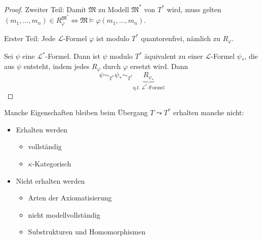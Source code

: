 \documentclass[12pt,parskip=full]{scrartcl}
\theoremstyle{definition}
\begin{document}
	\begin{proof}
		Zweiter Teil: Damit $\mathfrak{M}$ zu Modell $\mathfrak{M}^*$ von $T^*$ wird, muss gelten $(m_1, \dots, m_n) \in R_\varphi^{\mathfrak{M}^*} \Leftrightarrow \mathfrak{M} \models \varphi(m_1, \dots, m_n)$.
		
		Erster Teil: Jede $\mathcal{L}$-Formel $\varphi$ ist modulo $T^*$ quantorenfrei, nämlich zu $R_\varphi$.
		
		Sei $\psi$ eine $\mathcal{L}^*$-Formel. Dann ist $\psi$ modulo $T^*$ äquivalent zu einer $\mathcal{L}$-Formel $\psi_*$, die aus $\psi$ entsteht, indem jedes $R_\varphi$ durch $\varphi$ ersetzt wird. Dann
		\begin{equation*}
			\psi \sim_{T^*} \psi_* \sim_{T^*} \underbrace{R_{\psi_*}}_\text{q.f. $\mathcal{L}^*$-Formel}
		\end{equation*}
	\end{proof}

	Manche Eigenschaften bleiben beim Übergang $T \leadsto T^*$ erhalten manche nicht:
	\begin{itemize}
		\item Erhalten werden
		\begin{itemize}
			\item vollständig
			\item $\kappa$-Kategorisch
		\end{itemize}
		\item Nicht erhalten werden
		\begin{itemize}
			\item Arten der Axiomatisierung
			\item nicht modellvollständig
			\item Substrukturen und Homomorphismen
		\end{itemize}
	\end{itemize}
\end{document}
